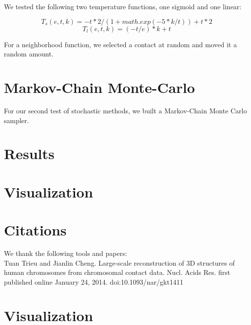 \documentclass{article}
\begin{document}
We tested the following two temperature functions, one sigmoid and one linear:

\begin{equation}
      T_s(e,t,k) =  -t*2/(1 + math.exp(-5*k/t)) + t*2
    \end{equation}
\begin{equation}
      T_l(e,t,k) =  (-t/e)*k + t
    \end{equation}
    
For a neighborhood function, we selected a contact at random and moved it a random amount.

\section{Markov-Chain Monte-Carlo}

For our second test of stochastic methods, we built a Markov-Chain Monte Carlo sampler.

\section{Results}



\section{Visualization}



\section{Citations}

We thank the following tools and papers: \\

Tuan Trieu and Jianlin Cheng.  Large-scale reconstruction of 3D structures of human chromosomes from chromosomal contact data.  Nucl. Acids Res. first published online January 24, 2014. doi:10.1093/nar/gkt1411


\section{Visualization}
\end{document}

